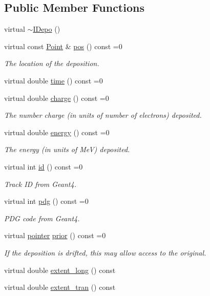\subsection*{Public Member Functions}
\begin{DoxyCompactItemize}
\item 
virtual \hyperlink{class_wire_cell_1_1_i_depo_af4f65a4847ecb15d3c2fc70b017d28e3}{$\sim$\+I\+Depo} ()
\item 
virtual const \hyperlink{namespace_wire_cell_ab2b2565fa6432efbb4513c14c988cda9}{Point} \& \hyperlink{class_wire_cell_1_1_i_depo_a6ea54d469c6d0429d16425917ec24241}{pos} () const =0
\begin{DoxyCompactList}\small\item\em The location of the deposition. \end{DoxyCompactList}\item 
virtual double \hyperlink{class_wire_cell_1_1_i_depo_abec395a8a8335d76ae07db2baf57ed83}{time} () const =0
\item 
virtual double \hyperlink{class_wire_cell_1_1_i_depo_a096a0b84b90685700f26950b0523c43c}{charge} () const =0
\begin{DoxyCompactList}\small\item\em The number charge (in units of number of electrons) deposited. \end{DoxyCompactList}\item 
virtual double \hyperlink{class_wire_cell_1_1_i_depo_a5dad2495f4b329fede8397203824f311}{energy} () const =0
\begin{DoxyCompactList}\small\item\em The energy (in units of MeV) deposited. \end{DoxyCompactList}\item 
virtual int \hyperlink{class_wire_cell_1_1_i_depo_ab32caab0a418f3fc0f185d8fc316537a}{id} () const =0
\begin{DoxyCompactList}\small\item\em Track ID from Geant4. \end{DoxyCompactList}\item 
virtual int \hyperlink{class_wire_cell_1_1_i_depo_a3a7a83ccfde95f79761cec6562fff82b}{pdg} () const =0
\begin{DoxyCompactList}\small\item\em P\+DG code from Geant4. \end{DoxyCompactList}\item 
virtual \hyperlink{class_wire_cell_1_1_i_data_aff870b3ae8333cf9265941eef62498bc}{pointer} \hyperlink{class_wire_cell_1_1_i_depo_a440532d005a463cc9df5731ddb96f601}{prior} () const =0
\begin{DoxyCompactList}\small\item\em If the deposition is drifted, this may allow access to the original. \end{DoxyCompactList}\item 
virtual double \hyperlink{class_wire_cell_1_1_i_depo_a196f71d7d22bf0b85948e2ff8e557c9c}{extent\+\_\+long} () const
\item 
virtual double \hyperlink{class_wire_cell_1_1_i_depo_afbb1cebfd10723b572e3959afa665b5e}{extent\+\_\+tran} () const
\end{DoxyCompactItemize}
